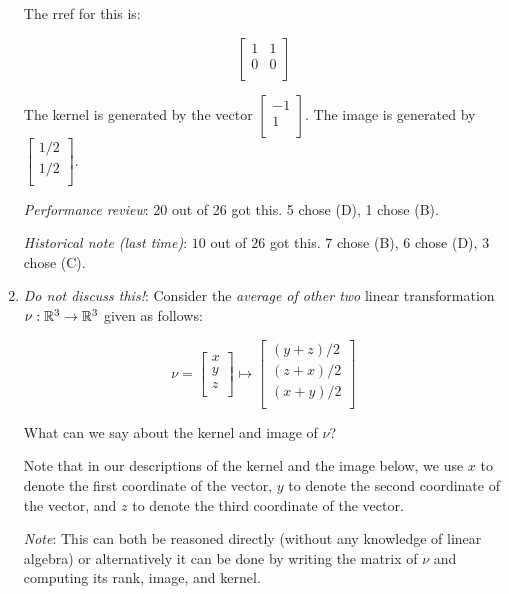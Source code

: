 \documentclass[10pt]{amsart}
\begin{document}
\begin{enumerate}
  The rref for this is:

  $$\left[\begin{matrix} 1 & 1 \\ 0 & 0 \\\end{matrix}\right]$$

  The kernel is generated by the vector $\left[\begin{matrix} -1 \\ 1
      \\\end{matrix}\right]$. The image is generated by
  $\left[\begin{matrix} 1/2 \\ 1/2 \\\end{matrix}\right]$.

  {\em Performance review}: 20 out of 26 got this. 5 chose (D), 1 chose (B).

  {\em Historical note (last time)}: $10$ out of $26$ got this. $7$ chose (B),
  $6$ chose (D), $3$ chose (C).

\item {\em Do not discuss this!}: Consider the {\em average of other
  two} linear transformation $\nu:\mathbb{R}^3 \to \mathbb{R}^3$ given as follows:

  $$\nu = \left[ \begin{matrix} x \\ y \\ z \\ \end{matrix}\right] \mapsto \left[ \begin{matrix} (y + z)/2 \\ (z + x)/2 \\ (x + y)/2 \\ \end{matrix} \right]$$

  What can we say about the kernel and image of $\nu$?

  Note that in our descriptions of the kernel and the image below, we
  use $x$ to denote the first coordinate of the vector, $y$ to denote
  the second coordinate of the vector, and $z$ to denote the third
  coordinate of the vector.

  {\em Note}: This can both be reasoned directly (without any
  knowledge of linear algebra) or alternatively it can be done by
  writing the matrix of $\nu$ and computing its rank, image, and
  kernel.


\end{enumerate}
\end{document}
